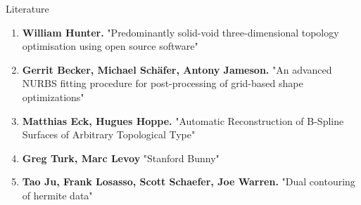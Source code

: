 \begin{frame}{Literature}
\begin{enumerate}
\item \textbf{William Hunter.} "Predominantly solid-void three-dimensional topology optimisation using open source software"
\item \textbf{Gerrit Becker, Michael Sch\"afer, Antony Jameson.} "An advanced NURBS fitting procedure for post-processing of grid-based shape optimizations"
\item \textbf{Matthias Eck, Hugues Hoppe.} "Automatic Reconstruction of B-Spline Surfaces of Arbitrary Topological Type"
\item \textbf{Greg Turk, Marc Levoy} "Stanford Bunny"
\item \textbf{Tao Ju, Frank Losasso, Scott Schaefer, Joe Warren.} "Dual contouring of hermite data"
\end{enumerate}
\end{frame}
